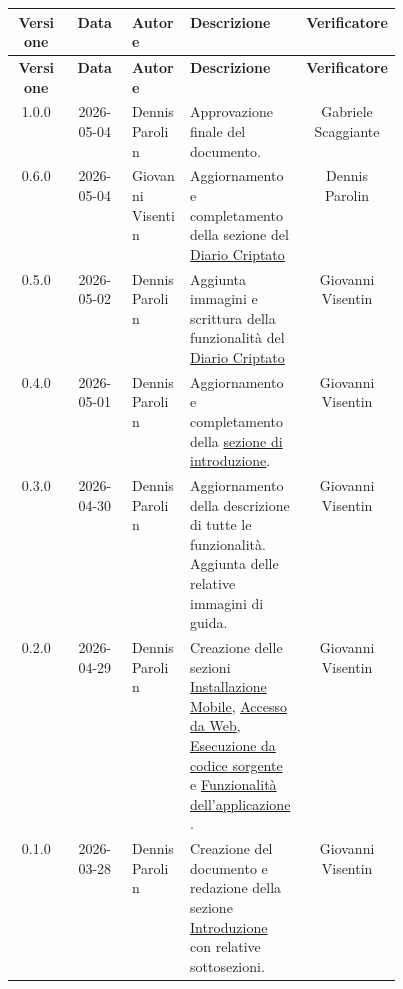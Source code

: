 \documentclass[a4paper,12pt]{article}
\begin{document}
\begin{center}
\small
\renewcommand{\arraystretch}{1.4}

\begin{longtable}{|c|c|>{\raggedright\arraybackslash}p{0.15\linewidth}|>{\raggedright\arraybackslash}p{0.3\linewidth}|c|}
\hline

\rowcolor{gray!60}
\textbf{Versione} & \textbf{Data} & \textbf{Autore} & \textbf{Descrizione} & \textbf{Verificatore} \\
\hline
\endfirsthead

\hline
\rowcolor{gray!60}
\textbf{Versione} & \textbf{Data} & \textbf{Autore} & \textbf{Descrizione} & \textbf{Verificatore} \\
\hline
\endhead

\rowcolor{white}
1.0.0 & 2026-05-04 & Dennis Parolin & Approvazione finale del documento. & Gabriele Scaggiante \\
\hline
\rowcolor{gray!20}
0.6.0 & 2026-05-04 & Giovanni Visentin & Aggiornamento e completamento della sezione del \hyperref[subsec:diario_criptato]{Diario Criptato} & Dennis Parolin \\
\hline
\rowcolor{white}
0.5.0 & 2026-05-02 & Dennis Parolin & Aggiunta immagini e scrittura della funzionalità del \hyperref[subsec:diario_criptato]{Diario Criptato} & Giovanni Visentin \\
\hline
\rowcolor{gray!20}
0.4.0 & 2026-05-01 & Dennis Parolin & Aggiornamento e completamento della \hyperref[sec:introduzione]{sezione di introduzione}. & Giovanni Visentin \\
\hline
\rowcolor{white}
0.3.0 & 2026-04-30 & Dennis Parolin & Aggiornamento della descrizione di tutte le funzionalità. Aggiunta delle relative immagini di guida. & Giovanni Visentin \\
\hline
\rowcolor{gray!20}
0.2.0 & 2026-04-29 & Dennis Parolin & Creazione delle sezioni \hyperref[sec:installazione_mobile]{Installazione Mobile}, \hyperref[sec:accesso_web]{Accesso da Web}, \hyperref[sec:esecuzione_sorgenti]{Esecuzione da codice sorgente} e \hyperref[sec:funzionalita]{Funzionalità dell'applicazione}. & Giovanni Visentin \\
\hline
\rowcolor{white}
0.1.0 & 2026-03-28 & Dennis Parolin & Creazione del documento e redazione della sezione \hyperref[sec:introduzione]{Introduzione} con relative sottosezioni. & Giovanni Visentin \\
\hline
\end{longtable}
\end{center}
\end{document}
